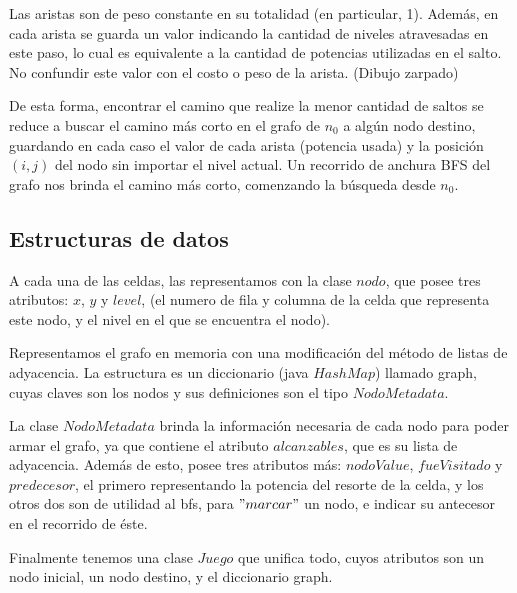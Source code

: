 \vspace{2mm}

Las aristas son de peso constante en su totalidad (en particular, 1). Adem\'as, en cada arista se guarda un valor indicando la cantidad de niveles atravesadas en este paso, lo cual es equivalente a la cantidad de potencias utilizadas en el salto. No confundir este valor con el costo o peso de la arista.
\vspace{2mm}
(Dibujo zarpado)
\vspace{2mm}

De esta forma, encontrar el camino que realize la menor cantidad de saltos se reduce a buscar el camino m\'as corto en el grafo de $n_0$ a alg\'un nodo destino, guardando en cada caso el valor de cada arista (potencia usada) y la posici\'on $(i,j)$ del nodo sin importar el nivel actual. Un recorrido de anchura BFS del grafo nos brinda el camino m\'as corto, comenzando la b\'usqueda desde $n_0$.

\subsection{Estructuras de datos}

A cada una de las celdas, las representamos con la clase $nodo$, que posee tres atributos: $x$, $y$ y $level$, (el numero de fila y columna de la celda que representa este nodo, y el nivel en el que se encuentra el nodo).

\vspace{2mm}

Representamos el grafo en memoria con una modificaci\'on del m\'etodo de listas de adyacencia. La estructura es un diccionario (java $HashMap$) llamado graph, cuyas claves son los nodos y sus definiciones son el tipo $NodoMetadata$.

\vspace{2mm}

La clase $NodoMetadata$ brinda la informaci\'on necesaria de cada nodo para poder armar el grafo, ya que contiene el atributo $alcanzables$, que es su lista de adyacencia. Adem\'as de esto, posee tres atributos m\'as: $nodoValue$, $fueVisitado$ y $predecesor$, el primero representando la potencia del resorte de la celda, y los otros dos son de utilidad al bfs, para $"marcar"$ un nodo, e indicar su antecesor en el recorrido de \'este.

\vspace{2mm}

Finalmente tenemos una clase $Juego$ que unifica todo, cuyos atributos son un nodo inicial, un nodo destino, y el diccionario graph.



